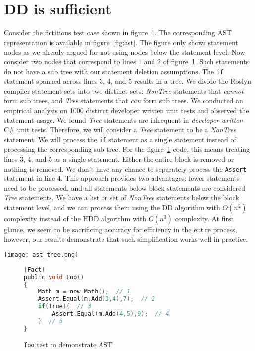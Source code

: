 \section{DD is sufficient}
Consider the fictitious test case shown in figure~\ref{fig:foo}. The corresponding AST representation is available in figure~\ref{fig:ast}. The figure only shows statement nodes as we already argued for not using nodes below the statement level. Now consider two nodes that correspond to lines 1 and 2 of figure~\ref{fig:foo}. Such statements do not have a sub tree with our statement deletion assumptions. The \texttt{if} statement spanned across lines 3, 4, and 5 results in a tree. We divide the Roslyn compiler statement sets into two distinct sets: \emph{NonTree} statements that \emph{cannot} form sub trees, and \emph{Tree} statements that \emph{can} form sub trees. We conducted an empirical analysis on 1000 distinct developer written unit tests and observed the statement usage. We found \emph{Tree} statements are infrequent in \emph{developer-written} C\# unit tests. Therefore, we will consider a \emph{Tree} statement to be a \emph{NonTree} statement. We will process the \texttt{if} statement as a single statement instead of processing the corresponding sub tree. For the figure~\ref{fig:foo} code, this means treating lines 3, 4, and 5 as a single statement. Either the entire block is removed or nothing is removed. We don't have any chance to separately process the \texttt{Assert} statement in line 4. This approach provides two advantages: fewer statements need to be processed, and all statements below block statements are considered \emph{Tree} statements. We have a list or set of  \emph{NonTree} statements below the block statement level, and we can process them using the DD algorithm with $O(n^2)$ complexity instead of the HDD algorithm with $O(n^3)$ complexity. At first glance, we seem to be sacrificing accuracy for efficiency in the entire process, however, our results demonstrate that such simplification works well in practice. 

\begin{figure*}
\texttt{[image: ast\_tree.png]}
\caption{AST of code in Figure~\ref{fig:foo}}
\label{fig:ast}
\end{figure*}

\begin{figure}
\begin{lstlisting}[language=C, linewidth=0.6\linewidth]
[Fact]
public void Foo()
{
	Math m = new Math();  // 1
	Assert.Equal(m.Add(3,4),7);  // 2
	if(true){  // 3
		Assert.Equal(m.Add(4,5),9);  // 4
	}  // 5
}
\end{lstlisting}
\caption{\texttt{foo} test to demonstrate AST}
\label{fig:foo}
\end{figure}
